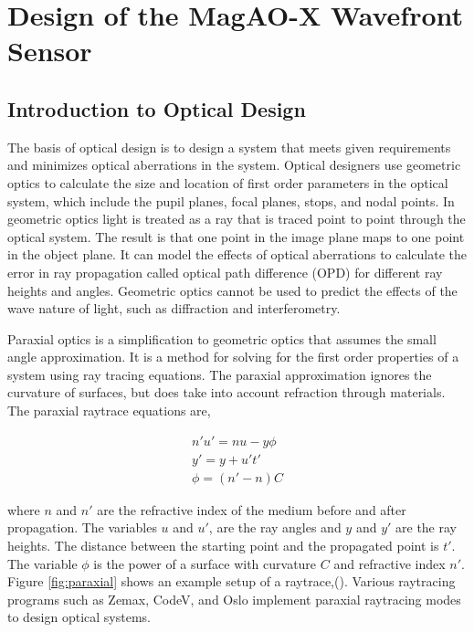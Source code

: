 \chapter{Design of the MagAO-X Wavefront Sensor}\label{CH3}

\section{Introduction to Optical Design}

The basis of optical design is to design a system that meets given requirements and minimizes optical aberrations in the system. Optical designers use geometric optics to calculate the size and location of first order parameters in the optical system, which include the pupil planes, focal planes, stops, and nodal points. In geometric optics light is treated as a ray that is traced point to point through the optical system. The result is that one point in the image plane maps to one point in the object plane. It can model the effects of optical aberrations to calculate the error in ray propagation called optical path difference (OPD) for different ray heights and angles. Geometric optics cannot be used to predict the effects of the wave nature of light, such as diffraction and interferometry. 

Paraxial optics is a simplification to geometric optics that assumes the small angle approximation. It is a method for solving for the first order properties of a system using ray tracing equations. The paraxial approximation ignores the curvature of surfaces, but does take into account refraction through materials. The paraxial raytrace equations are,

\begin{eqnarray}
       n'u'=nu -y\phi  \label{4PWFSslopes} \\
       y'=y+u't' \nonumber \\
       \phi =(n'-n)C
\end{eqnarray}

where $n$ and $n'$ are the refractive index of the medium before and after propagation. The variables $u$ and $u'$, are the ray angles and $y$ and $y'$ are the ray heights. The distance between the starting point and the propagated point is $t'$. The variable $\phi$ is the power of a surface with curvature $C$ and refractive index $n'$. Figure \ref{fig:paraxial} shows an example setup of a raytrace,(\cite{greivenkamp2004field}). Various raytracing programs such as Zemax, CodeV, and Oslo implement paraxial raytracing modes to design optical systems. 


